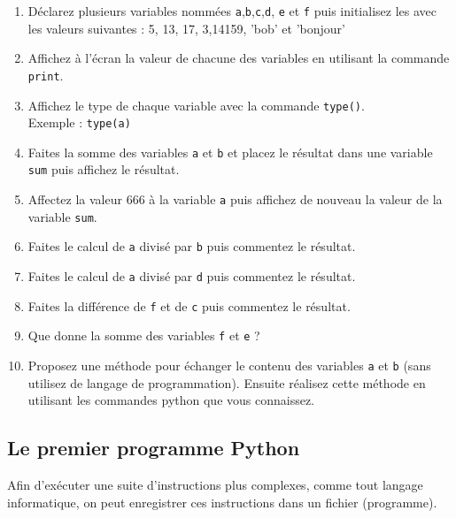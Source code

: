 \begin{enumerate}

\item Déclarez plusieurs variables nommées \texttt{a},\texttt{b},\texttt{c},\texttt{d}, \texttt{e} et \texttt{f}
            puis initialisez les avec les valeurs suivantes : 5, 13, 17, 3,14159, 'bob' et 'bonjour'

\item Affichez à l'écran la valeur de chacune des variables en utilisant la commande \texttt{print}.

\item Affichez le type de chaque variable avec la commande \texttt{type()}.\\
  Exemple : \texttt{type(a)}

\item Faites la somme des variables \texttt{a} et \texttt{b} et placez le
  résultat dans une variable \texttt{sum} puis affichez le résultat.

\item Affectez la valeur 666 à la variable \texttt{a} puis affichez de nouveau la valeur de la variable \texttt{sum}.

\item Faites le calcul de \texttt{a} divisé par \texttt{b} puis commentez le résultat.

\item Faites le calcul de \texttt{a} divisé par \texttt{d} puis commentez le résultat.

\item Faites la différence de \texttt{f} et de \texttt{c} puis commentez le résultat.

\item Que donne la somme des variables \texttt{f} et \texttt{e} ?

\item Proposez une méthode pour échanger le contenu des variables \texttt{a} et \texttt{b} (sans utilisez de langage de programmation).
  Ensuite réalisez cette méthode en utilisant les commandes python que vous connaissez.

\end{enumerate}


\subsection{Le premier programme Python}

Afin d'exécuter une suite d'instructions plus complexes,
comme tout langage informatique, on peut enregistrer ces
instructions dans un fichier (programme).

